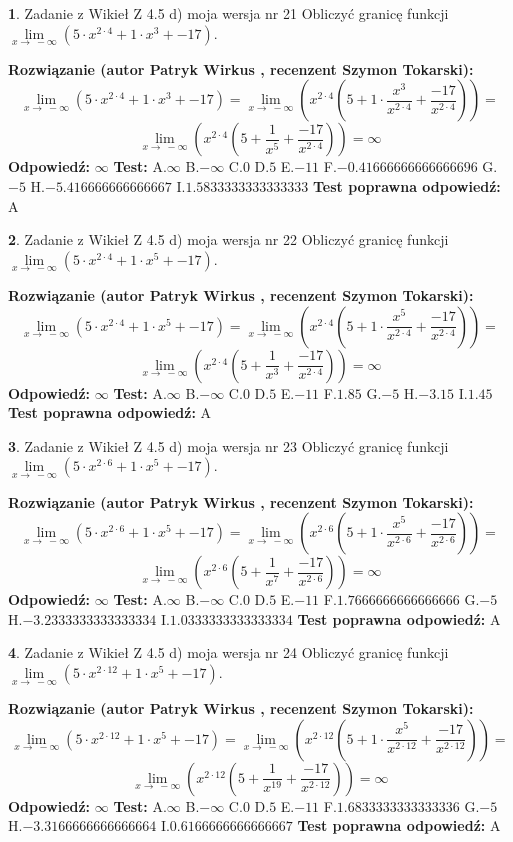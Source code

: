 \documentclass[12pt, a4paper]{article}
\theoremstyle{definition} %
\newtheorem{zad}{}
\newcommand{\zadStart}[1]{\begin{zad}#1\newline}
\newcommand{\zadStop}{\end{zad}}
\newcommand{\rozwStart}[2]{\noindent \textbf{Rozwiązanie (autor #1 , recenzent #2): }\newline}
\newcommand{\rozwStop}{\newline}
\newcommand{\odpStart}{\noindent \textbf{Odpowiedź:}\newline}
\newcommand{\odpStop}{\newline}
\newcommand{\testStart}{\noindent \textbf{Test:}\newline}
\newcommand{\testStop}{\newline}
\newcommand{\kluczStart}{\noindent \textbf{Test poprawna odpowiedź:}\newline}
\newcommand{\kluczStop}{\newline}
\begin{document}
\zadStart{Zadanie z Wikieł Z 4.5 d) moja wersja nr 21}
Obliczyć granicę funkcji  $\lim\limits_{x\to\ -\infty}(5 \cdot x^{2\cdot4}+1 \cdot x^{3}+-17)$.
\zadStop
\rozwStart{Patryk Wirkus}{Szymon Tokarski}
$$\lim\limits_{x\to\ -\infty}(5 \cdot x^{2\cdot4}+1 \cdot x^{3}+-17) = \lim\limits_{x\to\ -\infty}(x^{2\cdot4}(5 +1 \cdot \frac{x^{3}}{x^{2\cdot4}}+\frac{-17}{x^{2\cdot4}})) =$$ $$\lim\limits_{x\to\ -\infty}(x^{2\cdot4}(5 +\frac{1}{x^{5}}+\frac{-17}{x^{2\cdot4}})) =\infty$$
\rozwStop
\odpStart
$\infty$
\odpStop
\testStart
A.$\infty$ B.$-\infty$ C.$0$ D.$5$ E.$-11$
F.$-0.41666666666666696$ G.$-5$
H.$-5.416666666666667$
I.$1.5833333333333333$
\testStop
\kluczStart
A
\kluczStop



\zadStart{Zadanie z Wikieł Z 4.5 d) moja wersja nr 22}
Obliczyć granicę funkcji  $\lim\limits_{x\to\ -\infty}(5 \cdot x^{2\cdot4}+1 \cdot x^{5}+-17)$.
\zadStop
\rozwStart{Patryk Wirkus}{Szymon Tokarski}
$$\lim\limits_{x\to\ -\infty}(5 \cdot x^{2\cdot4}+1 \cdot x^{5}+-17) = \lim\limits_{x\to\ -\infty}(x^{2\cdot4}(5 +1 \cdot \frac{x^{5}}{x^{2\cdot4}}+\frac{-17}{x^{2\cdot4}})) =$$ $$\lim\limits_{x\to\ -\infty}(x^{2\cdot4}(5 +\frac{1}{x^{3}}+\frac{-17}{x^{2\cdot4}})) =\infty$$
\rozwStop
\odpStart
$\infty$
\odpStop
\testStart
A.$\infty$ B.$-\infty$ C.$0$ D.$5$ E.$-11$
F.$1.85$ G.$-5$
H.$-3.15$
I.$1.45$
\testStop
\kluczStart
A
\kluczStop



\zadStart{Zadanie z Wikieł Z 4.5 d) moja wersja nr 23}
Obliczyć granicę funkcji  $\lim\limits_{x\to\ -\infty}(5 \cdot x^{2\cdot6}+1 \cdot x^{5}+-17)$.
\zadStop
\rozwStart{Patryk Wirkus}{Szymon Tokarski}
$$\lim\limits_{x\to\ -\infty}(5 \cdot x^{2\cdot6}+1 \cdot x^{5}+-17) = \lim\limits_{x\to\ -\infty}(x^{2\cdot6}(5 +1 \cdot \frac{x^{5}}{x^{2\cdot6}}+\frac{-17}{x^{2\cdot6}})) =$$ $$\lim\limits_{x\to\ -\infty}(x^{2\cdot6}(5 +\frac{1}{x^{7}}+\frac{-17}{x^{2\cdot6}})) =\infty$$
\rozwStop
\odpStart
$\infty$
\odpStop
\testStart
A.$\infty$ B.$-\infty$ C.$0$ D.$5$ E.$-11$
F.$1.7666666666666666$ G.$-5$
H.$-3.2333333333333334$
I.$1.0333333333333334$
\testStop
\kluczStart
A
\kluczStop



\zadStart{Zadanie z Wikieł Z 4.5 d) moja wersja nr 24}
Obliczyć granicę funkcji  $\lim\limits_{x\to\ -\infty}(5 \cdot x^{2\cdot12}+1 \cdot x^{5}+-17)$.
\zadStop
\rozwStart{Patryk Wirkus}{Szymon Tokarski}
$$\lim\limits_{x\to\ -\infty}(5 \cdot x^{2\cdot12}+1 \cdot x^{5}+-17) = \lim\limits_{x\to\ -\infty}(x^{2\cdot12}(5 +1 \cdot \frac{x^{5}}{x^{2\cdot12}}+\frac{-17}{x^{2\cdot12}})) =$$ $$\lim\limits_{x\to\ -\infty}(x^{2\cdot12}(5 +\frac{1}{x^{19}}+\frac{-17}{x^{2\cdot12}})) =\infty$$
\rozwStop
\odpStart
$\infty$
\odpStop
\testStart
A.$\infty$ B.$-\infty$ C.$0$ D.$5$ E.$-11$
F.$1.6833333333333336$ G.$-5$
H.$-3.3166666666666664$
I.$0.6166666666666667$
\testStop
\kluczStart
A
\kluczStop
\end{document}
